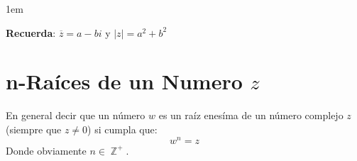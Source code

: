 \documentclass[12pt, fleqn]{report}                             %
\newenvironment{SmallIndentation}[1][0.75em]                    %
    {\begin{adjustwidth}{#1}{}\begin{footnotesize}}                 %
    {\end{footnotesize}\end{adjustwidth}}                           %
\DeclareMathOperator \Integers  {\mathbb{Z}}                     %
\begin{document}
\begin{itemize}
                    \begin{SmallIndentation}[1em]
                        \textbf{Recuerda}: $\overline{z} = a - bi$ y $|z| = a^2 + b^2$
                    \end{SmallIndentation}

                

            \end{itemize}



        \clearpage
        \section{n-Raíces de un Numero $z$}

            En general decir que un número $w$ es un raíz enesíma de un número complejo $z$ (siempre
            que $z \neq 0$) si cumpla que:
            \begin{equation}
                w^n = z
            \end{equation}
            Donde obviamente $n \in \Integers^+$.
\end{document}
